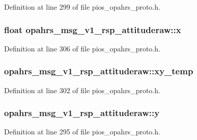 Definition at line 299 of file pios\-\_\-opahrs\-\_\-proto.\-h.

\hypertarget{structopahrs__msg__v1__rsp__attituderaw_a4d0811941cdb946ee603405f25b33ccf}{
\subsubsection[{x}]{\setlength{\rightskip}{0pt plus 5cm}float opahrs\-\_\-msg\-\_\-v1\-\_\-rsp\-\_\-attituderaw\-::x}}\label{structopahrs__msg__v1__rsp__attituderaw_a4d0811941cdb946ee603405f25b33ccf}


Definition at line 306 of file pios\-\_\-opahrs\-\_\-proto.\-h.

\hypertarget{structopahrs__msg__v1__rsp__attituderaw_ae0e8a729f11ef0b69380fd8f6d3d251c}{
\subsubsection[{xy\-\_\-temp}]{ opahrs\-\_\-msg\-\_\-v1\-\_\-rsp\-\_\-attituderaw\-::xy\-\_\-temp}}\label{structopahrs__msg__v1__rsp__attituderaw_ae0e8a729f11ef0b69380fd8f6d3d251c}


Definition at line 302 of file pios\-\_\-opahrs\-\_\-proto.\-h.

\hypertarget{structopahrs__msg__v1__rsp__attituderaw_aaa509b191de60b71c18f62cd4ba1cef5}{
\subsubsection[{y}]{ opahrs\-\_\-msg\-\_\-v1\-\_\-rsp\-\_\-attituderaw\-::y}}\label{structopahrs__msg__v1__rsp__attituderaw_aaa509b191de60b71c18f62cd4ba1cef5}


Definition at line 295 of file pios\-\_\-opahrs\-\_\-proto.\-h.

